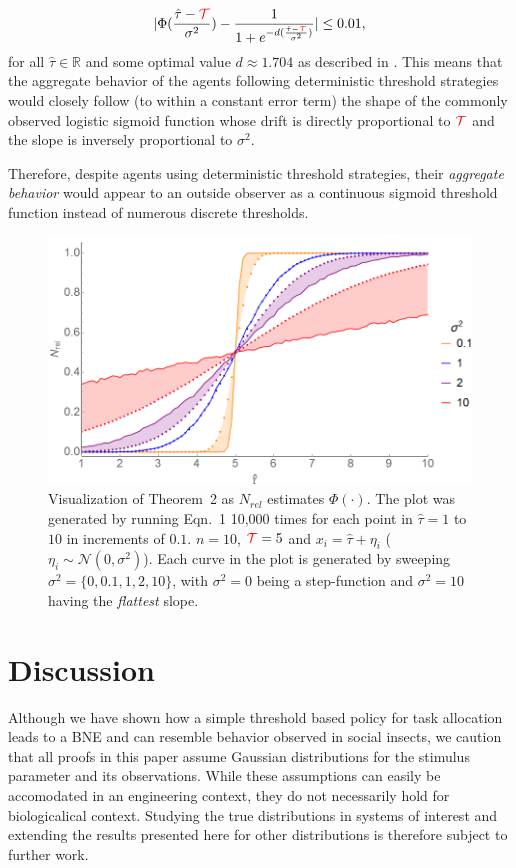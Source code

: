 \documentclass[smallextended]{svjour3}       %
\newcommand{\edit}[1]{\textcolor{red}{#1}}
\def\R{\mathbb{R}}    %
\def\td{\edit{\mathcal{T}}}   %
\begin{document}
\vspace{-20px}
\begin{align*}
|\Phi(\frac{\hat{\tau}-\td}{\sigma^2})-\frac{1}{1+e^{-d(\frac{\hat{\tau}-\td}{\sigma^2})}}|\leq 0.01,
\end{align*}
for all $\hat{\tau}\in\R$ and some optimal value $d\approx 1.704$ as described in \citep{Camilli1994}. This means that the aggregate behavior of the agents following deterministic threshold strategies would closely follow (to within a constant error term) the shape of the commonly observed logistic sigmoid function whose drift is directly proportional to $\td$ and the slope is inversely proportional to $\sigma^2$. 

Therefore, despite agents using deterministic threshold strategies, their \emph{aggregate behavior} would appear to an outside observer as a continuous sigmoid threshold function instead of numerous discrete thresholds.
\begin{figure}[!ht]
	\centering\includegraphics[width=0.6\columnwidth]{figures/thm2fig.png}
	\centering\caption{Visualization of Theorem~2 as $N_{rel}$ estimates $\Phi(\cdot)$. The plot was generated by running Eqn.~1 10,000 times for each point in $\hat{\tau} = 1$ to $10$ in increments of $0.1$. $n = 10$, $\td = 5$ and $x_i = \hat{\tau} + \eta_i$ ($\eta_i \sim\mathcal{N}(0, \sigma^2)$). Each curve in the plot is generated by sweeping $\sigma^2 = \{0, 0.1, 1, 2, 10\}$, with $\sigma^2 = 0$ being a step-function and $\sigma^2 = 10$ having the \emph{flattest} slope.}\label{fig:thm2fig}
\end{figure}

\section{Discussion}
Although we have shown how a simple threshold based policy for task allocation leads to a BNE and can resemble behavior observed in social insects, we caution that all proofs in this paper assume Gaussian distributions for the stimulus parameter and its observations. While these assumptions can easily be accomodated in an engineering context, they do not necessarily hold for biologicalical context. Studying the true distributions in systems of interest and extending the results presented here for other distributions is therefore subject to further work. 
\end{document}
